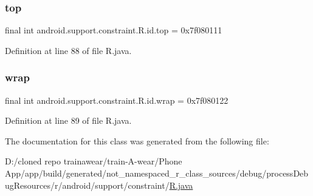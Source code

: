 \subsubsection{\texorpdfstring{top}{top}}
{\footnotesize\ttfamily final int android.\+support.\+constraint.\+R.\+id.\+top = 0x7f080111\hspace{0.3cm}{\ttfamily [static]}}



Definition at line 88 of file R.\+java.

\mbox{\label{classandroid_1_1support_1_1constraint_1_1_r_1_1id_ae0562e247c624b01fdf91a6e003f141d}} 
\subsubsection{\texorpdfstring{wrap}{wrap}}
{\footnotesize\ttfamily final int android.\+support.\+constraint.\+R.\+id.\+wrap = 0x7f080122\hspace{0.3cm}{\ttfamily [static]}}



Definition at line 89 of file R.\+java.



The documentation for this class was generated from the following file\+:\begin{DoxyCompactItemize}
\item 
D\+:/cloned repo trainawear/train-\/\+A-\/wear/\+Phone App/app/build/generated/not\+\_\+namespaced\+\_\+r\+\_\+class\+\_\+sources/debug/process\+Debug\+Resources/r/android/support/constraint/\mbox{\hyperlink{process_debug_resources_2r_2android_2support_2constraint_2_r_8java}{R.\+java}}\end{DoxyCompactItemize}
